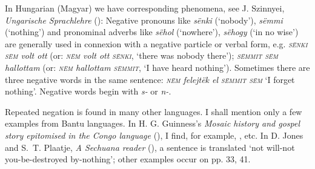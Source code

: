 In Hungarian (Magyar) we have corresponding phenomena, see J. Szinnyei, \textit{Ungarische Sprachlehre} (\citeyear[§119]{szinnyei1912}): %
Negative pronouns like \textit{sënki} (`nobody'), \textit{sëmmi} (`nothing') and pronominal adverbs like \textit{sëhol} (`nowhere'), \textit{sëhogy} (`in no wise') are generally used in connexion with a negative particle or verbal form, e.g. \textit{\textsc{sënki sëm} volt ott} (or: \textit{\textsc{nëm} volt ott \textsc{sënki}}, `there was nobody there'); \textit{\textsc{sëmmit sëm} hallottam} (or: \textit{\textsc{nëm} hallottam \textsc{sëmmit}}, `I have heard nothing'). Sometimes there are three negative words in the same sentence: \textit{\textsc{nëm} felejtëk el \textsc{sëmmit sëm}} `I forget nothing'. Negative words begin with \textit{s-} or \textit{n-}.

Repeated negation is found in many other languages. I shall mention only a few examples from Bantu languages. In H. G. Guinness's \textit{Mosaic history and gospel story epitomised in the Congo language} (\citeyear{guinness1882mosaic}), %
I find, for example, , etc. In D. Jones and S.~T. Plaatje, \textit{A Sechuana reader} (\citeyear[\href{https://archive.org/details/sechuanareaderin00joneuoft/page/14/mode/2up?view=theater}{15}]{jones1916sechuanareader}), %
a sentence is translated `not will-not you-be-destroyed by-nothing'; other examples occur on pp. 33, 41. %

